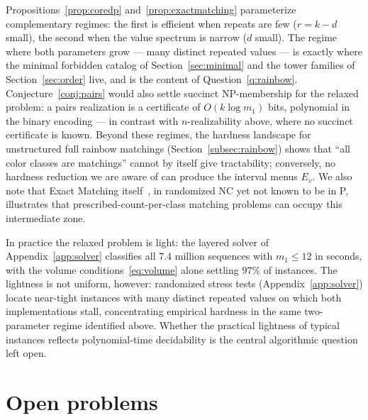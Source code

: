 \documentclass[11pt]{article}
\theoremstyle{definition}
\theoremstyle{remark}
\begin{document}
Propositions~\ref{prop:coredp} and~\ref{prop:exactmatching} parameterize
complementary regimes: the first is efficient when repeats are few ($r=k-d$
small), the second when the value spectrum is narrow ($d$ small). The regime
where both parameters grow --- many distinct repeated values --- is exactly where
the minimal forbidden catalog of Section~\ref{sec:minimal} and the tower families
of Section~\ref{sec:order} live, and is the content of
Question~\ref{q:rainbow}. Conjecture~\ref{conj:pairs} would also settle succinct
NP-membership for the relaxed problem: a pairs realization is a certificate of
$O(k\log m_1)$ bits, polynomial in the binary encoding --- in contrast with
$n$-realizability above, where no succinct certificate is known. Beyond these
regimes, the hardness landscape for unstructured full rainbow
matchings (Section~\ref{subsec:rainbow}) shows that ``all color classes are
matchings'' cannot by itself give tractability; conversely, no hardness reduction
we are aware of can produce the interval menus $E_v$. We also note that Exact
Matching itself~\cite{PapadimitriouYannakakis82}, in randomized NC yet
not known to be in P, illustrates that prescribed-count-per-class matching
problems can occupy this intermediate zone.

In practice the relaxed problem is light: the layered solver of
Appendix~\ref{app:solver} classifies all $7.4$ million sequences with $m_1\le12$
in seconds, with the volume conditions~\eqref{eq:volume} alone settling $97\%$ of
instances. The lightness is not uniform, however: randomized
stress tests (Appendix~\ref{app:solver}) locate near-tight instances with many
distinct repeated values on which both implementations stall, concentrating
empirical hardness in the same two-parameter regime identified above. Whether
the practical lightness of typical instances reflects polynomial-time
decidability is the central algorithmic question left open.

\section{Open problems}\label{sec:open}
\end{document}
